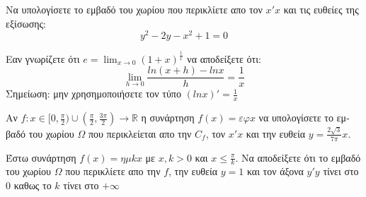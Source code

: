 \documentclass{exam}
\begin{document}
\begin{questions}
        \setcounter{equation}{0}
        \vspace{0.5cm}
        
        \question \textgreek{Να υπολογίσετε το εμβαδό του χωρίου που περικλίετε απο τον $x'x$ και τις ευθείες της εξίσωσης:}
        \begin{equation*}
            y^2 - 2y -x^2 + 1 = 0
        \end{equation*}
        
        \setcounter{equation}{0}
        \vspace{0.5cm}

        \question \textgreek{Εαν γνωρίζετε ότι $e = \lim_{x\to0}(1+x)^\frac{1}{x}$ να αποδείξετε ότι: }
        \begin{equation*}
            \lim_{h\to0}\frac{ln(x+h) - lnx}{h} = \frac{1}{x}
        \end{equation*}
        \textgreek{Σημείωση: μην χρησημοποιήσετε τον τύπο $(lnx)' = \frac{1}{x}$}

        \setcounter{equation}{0}
        \vspace{0.5cm}

        \question \textgreek{Αν $f:x\in[0,\frac{\pi}{2})\cup(\frac{\pi}{2}, \frac{3\pi}{2})\rightarrow\mathbb{R}$ 
        η συνάρτηση $f(x) = \varepsilon\varphi x$ να υπολογίσετε το εμβαδό του χωρίου $\Omega$ 
        που περικλείεται απο την $C_f$, τον $x'x$ και την ευθεία $y=\frac{2\sqrt{3}}{7\pi}x$.}

        \setcounter{equation}{0}
        \vspace{0.5cm}

        \question \textgreek{Έστω συνάρτηση $f(x) = \eta\mu kx$ με $x,k>0$ και 
        $x\leq\frac{\pi}{k}$. Να αποδείξετε ότι το εμβαδό του χωρίου $\Omega$ που 
        περικλίετε απο την $f$, την ευθεία $y=1$ και τον άξονα $y'y$
        τίνει στο 0 καθως το $k$ τίνει στο $+\infty$}

    \end{questions}
\end{document}
